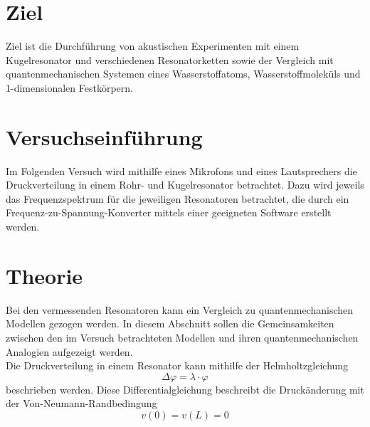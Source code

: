 \section{Ziel}
Ziel ist die Durchführung von akustischen Experimenten mit einem Kugelresonator und verschiedenen Resonatorketten
sowie der Vergleich mit quantenmechanischen Systemen eines Wasserstoffatoms, Wasserstoffmoleküls und 1-dimensionalen Festkörpern.

\section{Versuchseinführung}
Im Folgenden Versuch wird mithilfe eines Mikrofons und eines Lautsprechers die Druckverteilung in einem Rohr- und Kugelresonator 
betrachtet. Dazu wird jeweils das Frequenzspektrum für die jeweiligen Resonatoren betrachtet, die durch ein Frequenz-zu-Spannung-Konverter
mittels einer geeigneten Software erstellt werden. 

\section{Theorie}
Bei den vermessenden Resonatoren kann ein Vergleich zu quantenmechanischen Modellen gezogen werden. In diesem 
Abschnitt sollen die Gemeinsamkeiten zwischen den im Versuch betrachteten Modellen und ihren
quantenmechanischen Analogien aufgezeigt werden.\\


Die Druckverteilung in einem Resonator kann mithilfe der Helmholtzgleichung
\begin{equation}
    \Delta \varphi=\lambda \cdot \varphi
    \label{eq:helmholtz_all}
\end{equation}
beschrieben werden. Diese Differentialgleichung beschreibt die Druckänderung mit der Von-Neumann-Randbedingung
\begin{equation*}
    v\left(0\right) = v\left(L\right) = 0
\end{equation*}




